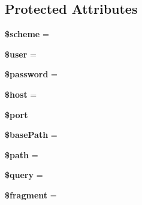 \subsection*{Protected Attributes}
\begin{DoxyCompactItemize}
\item 
\mbox{\label{class_pes_1_1_http_1_1_uri_a1665950e3e3b63a02fc5a48706ac81c4}} 
{\bfseries \$scheme} = \textquotesingle{}\textquotesingle{}
\item 
\mbox{\label{class_pes_1_1_http_1_1_uri_a598ca4e71b15a1313ec95f0df1027ca5}} 
{\bfseries \$user} = \textquotesingle{}\textquotesingle{}
\item 
\mbox{\label{class_pes_1_1_http_1_1_uri_a607686ef9f99ea7c42f4f3dd3dbb2b0d}} 
{\bfseries \$password} = \textquotesingle{}\textquotesingle{}
\item 
\mbox{\label{class_pes_1_1_http_1_1_uri_a711797613cb863ca0756df789c396bf2}} 
{\bfseries \$host} = \textquotesingle{}\textquotesingle{}
\item 
\mbox{\label{class_pes_1_1_http_1_1_uri_aa0787efab4b22e8a212882f3409d4c77}} 
{\bfseries \$port}
\item 
\mbox{\label{class_pes_1_1_http_1_1_uri_a9cd745428004768fe921475a29a7d870}} 
{\bfseries \$base\+Path} = \textquotesingle{}\textquotesingle{}
\item 
\mbox{\label{class_pes_1_1_http_1_1_uri_a0a4baf0b22973c07685c3981f0d17fc4}} 
{\bfseries \$path} = \textquotesingle{}\textquotesingle{}
\item 
\mbox{\label{class_pes_1_1_http_1_1_uri_af59a5f7cd609e592c41dc3643efd3c98}} 
{\bfseries \$query} = \textquotesingle{}\textquotesingle{}
\item 
\mbox{\label{class_pes_1_1_http_1_1_uri_a8e95b234630b407d4e4d9f67a129e18a}} 
{\bfseries \$fragment} = \textquotesingle{}\textquotesingle{}
\end{DoxyCompactItemize}


